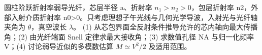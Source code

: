 圆柱阶跃折射率弱导光纤，芯层半径 a、折射率 \(n_1>n_2>0\)，包层折射率 n2，外部入射介质折射率 n0>0。只考虑理想子午光线与几何光学导波，入射光与光纤轴夹角为 \(\theta \)，真空波长 \(\lambda \)。
(1) 从芯包界面全反射条件推导允许的芯内轴向最大传播角；(2) 由光纤端面 Snell 定律求最大接收角；(3) 求数值孔径 NA 与归一化频率 V；(4) 讨论弱导近似的多模数估算 \(M\simeq V^2/2\) 及适用范围。
